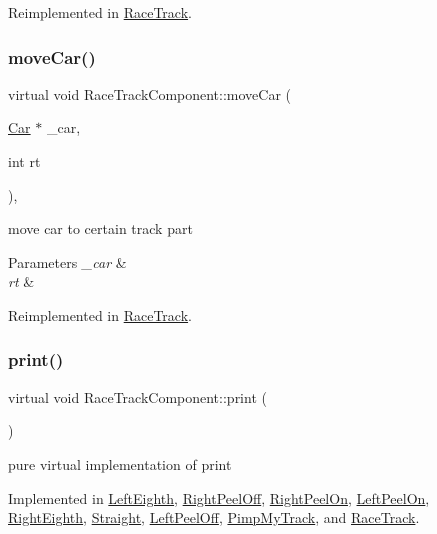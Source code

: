 Reimplemented in \mbox{\hyperlink{class_race_track_abe1b09c550e3c99eb806ccf24aa74acb}{Race\+Track}}.

\mbox{\label{class_race_track_component_a1925fdddd2cc1541fe649152bacb58ca}} 
\subsubsection{\texorpdfstring{move\+Car()}{moveCar()}}
{\footnotesize\ttfamily virtual void Race\+Track\+Component\+::move\+Car (\begin{DoxyParamCaption}\item[{\mbox{\hyperlink{class_car}{Car}} $\ast$}]{\+\_\+car,  }\item[{int}]{rt }\end{DoxyParamCaption})\hspace{0.3cm}{\ttfamily [inline]}, {\ttfamily [virtual]}}

move car to certain track part 
\begin{DoxyParams}{Parameters}
{\em \+\_\+car} & \\
\hline
{\em rt} & \\
\hline
\end{DoxyParams}


Reimplemented in \mbox{\hyperlink{class_race_track_af5549716e03ebf425f0683f0db4bd825}{Race\+Track}}.

\mbox{\label{class_race_track_component_a02a8d9520cfd80f31dd94b5fa1e76d47}} 
\subsubsection{\texorpdfstring{print()}{print()}}
{\footnotesize\ttfamily virtual void Race\+Track\+Component\+::print (\begin{DoxyParamCaption}{ }\end{DoxyParamCaption})\hspace{0.3cm}{\ttfamily [pure virtual]}}

pure virtual implementation of print 

Implemented in \mbox{\hyperlink{class_left_eighth_ae5167cfc8af05a977d751cd0838ea17e}{Left\+Eighth}}, \mbox{\hyperlink{class_right_peel_off_a097f627c43aedcc60c89d2760a67c233}{Right\+Peel\+Off}}, \mbox{\hyperlink{class_right_peel_on_a6c54c5dbffa104bb96e7b564e854dd74}{Right\+Peel\+On}}, \mbox{\hyperlink{class_left_peel_on_a929012f0508e2207ae4c8229aecece54}{Left\+Peel\+On}}, \mbox{\hyperlink{class_right_eighth_a2d35c272dce18f3f6e9e297605877794}{Right\+Eighth}}, \mbox{\hyperlink{class_straight_ae95d3bdc1d16c97c8d6a6ab60e3205e4}{Straight}}, \mbox{\hyperlink{class_left_peel_off_aafa7fd3e608c6b08ea8b1bde7447c4f3}{Left\+Peel\+Off}}, \mbox{\hyperlink{class_pimp_my_track_a1b292c061991d5797183610f41180b91}{Pimp\+My\+Track}}, and \mbox{\hyperlink{class_race_track_afc353278ed272b8deb07283c3c45388e}{Race\+Track}}.

